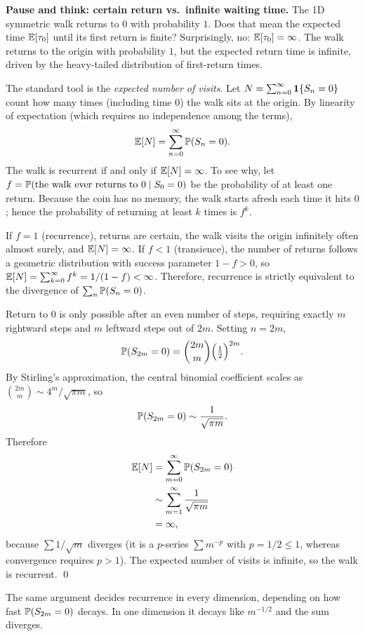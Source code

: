 \textbf{Pause and think: certain return vs.\ infinite waiting time.} The 1D
symmetric walk returns to $0$ with probability $1$. Does that mean the
expected time $\E[\tau_0]$ until its first return is finite? Surprisingly,
no: $\E[\tau_0] = \infty$. The walk returns to the origin with probability $1$,
but the expected return time is infinite, driven by the heavy-tailed distribution of first-return times.

\begin{whybox}
The standard tool is the \emph{expected number of visits}. Let
$N = \sum_{n=0}^\infty \ind\{S_n = 0\}$ count how many times (including time
$0$) the walk sits at the origin. By linearity of expectation (which requires
no independence among the terms),
\[
  \E[N] = \sum_{n=0}^\infty \P(S_n = 0).
\]
The walk is recurrent if and only if
$\E[N] = \infty$. To see why, let $f = \P(\text{the walk ever returns to } 0 \mid S_0 = 0)$
be the probability of at least one return. Because the coin has no memory, the
walk starts afresh each time it hits $0$; hence the probability of returning at
least $k$ times is $f^k$.

If $f = 1$ (recurrence), returns are certain, the walk visits the origin
infinitely often almost surely, and $\E[N] = \infty$. If $f < 1$ (transience),
the number of returns follows a geometric distribution with success parameter
$1 - f > 0$, so $\E[N] = \sum_{k=0}^\infty f^k = 1/(1-f) < \infty$. Therefore,
recurrence is strictly equivalent to the divergence of $\sum_n \P(S_n = 0)$.

Return to $0$ is only possible after an even number of steps, requiring exactly
$m$ rightward steps and $m$ leftward steps out of $2m$. Setting $n = 2m$,
\[
  \P(S_{2m} = 0) = \binom{2m}{m}\Big(\tfrac{1}{2}\Big)^{2m}.
\]
By Stirling's approximation, the central binomial coefficient scales as
$\binom{2m}{m} \sim 4^m/\sqrt{\pi m}$, so
\[
  \P(S_{2m} = 0) \sim \frac{1}{\sqrt{\pi m}}.
\]
Therefore
\begin{align*}
  \E[N] &= \sum_{m=0}^\infty \P(S_{2m}=0) \\
  &\sim \sum_{m=1}^\infty \frac{1}{\sqrt{\pi m}} \\
  &= \infty,
\end{align*}
because $\sum 1/\sqrt{m}$ diverges (it is a $p$-series $\sum m^{-p}$ with
$p = 1/2 \le 1$, whereas convergence requires $p > 1$). The expected number of
visits is infinite, so the walk is recurrent. \qed
\end{whybox}

The same argument decides recurrence in every dimension, depending on how fast $\P(S_{2m}=0)$ decays. In one dimension it decays like $m^{-1/2}$ and the sum diverges.

